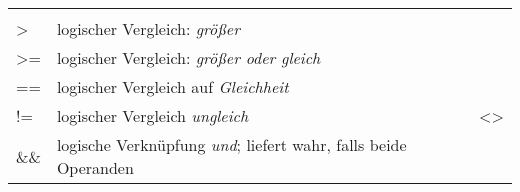 \begin{longtable}[c]{@{}lll@{}}
\begin{minipage}[t]{0.15\columnwidth}
\end{minipage}
\\\noalign{\medskip}
\begin{minipage}[t]{0.08\columnwidth}\raggedright
\textgreater{}
\end{minipage} & \begin{minipage}[t]{0.77\columnwidth}\raggedright
logischer Vergleich: \emph{größer}
\end{minipage} & \begin{minipage}[t]{0.15\columnwidth}\raggedright
\end{minipage}
\\\noalign{\medskip}
\begin{minipage}[t]{0.08\columnwidth}\raggedright
\textgreater{}=
\end{minipage} & \begin{minipage}[t]{0.77\columnwidth}\raggedright
logischer Vergleich: \emph{größer oder gleich}
\end{minipage} & \begin{minipage}[t]{0.15\columnwidth}\raggedright
\end{minipage}
\\\noalign{\medskip}
\begin{minipage}[t]{0.08\columnwidth}\raggedright
==
\end{minipage} & \begin{minipage}[t]{0.77\columnwidth}\raggedright
logischer Vergleich auf \emph{Gleichheit}
\end{minipage} & \begin{minipage}[t]{0.15\columnwidth}\raggedright
\end{minipage}
\\\noalign{\medskip}
\begin{minipage}[t]{0.08\columnwidth}\raggedright
!=
\end{minipage} & \begin{minipage}[t]{0.77\columnwidth}\raggedright
logischer Vergleich \emph{ungleich}
\end{minipage} & \begin{minipage}[t]{0.15\columnwidth}\raggedright
\textless{}\textgreater{}
\end{minipage}
\\\noalign{\medskip}
\begin{minipage}[t]{0.08\columnwidth}\raggedright
\&\&
\end{minipage} & \begin{minipage}[t]{0.77\columnwidth}\raggedright
logische Verknüpfung \emph{und}; liefert wahr, falls beide Operanden

\end{minipage}
\end{longtable}
